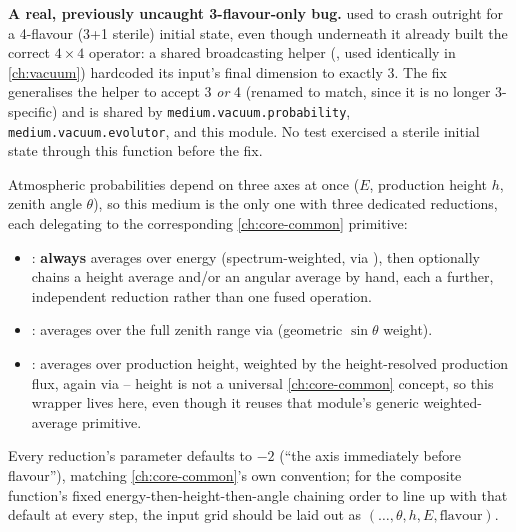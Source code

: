 \begin{notebox}
\textbf{A real, previously uncaught 3-flavour-only bug.}
 used to crash outright for a
4-flavour (3+1 sterile) initial state, even though
 underneath it already built the correct
$4\times4$ operator: a shared broadcasting helper
(, used identically in
\cref{ch:vacuum}) hardcoded its input's final dimension to exactly 3. The
fix generalises the helper to accept 3 \emph{or} 4 (renamed
 to match, since it is no longer
3-specific) and is shared by \texttt{medium.vacuum.probability},
\texttt{medium.vacuum.evolutor}, and this module. No test exercised a
sterile initial state through this function before the fix.
\end{notebox}

\begin{implbox}
Atmospheric probabilities depend on three axes at once ($E$, production
height $h$, zenith angle $\theta$), so this medium is the only one with
three dedicated  reductions, each delegating to the
corresponding \cref{ch:core-common} primitive:
\begin{itemize}
  \item {}:
    \textbf{always} averages over energy (spectrum-weighted, via
    ), then
    optionally chains a height average and/or an angular average by hand,
    each a further, independent reduction rather than one fused operation.
  \item {}:
    averages over the full zenith range via
    (geometric $\sin\theta$ weight).
  \item {}:
    averages over production height, weighted by the height-resolved
    production flux, again via
     -- height is
    not a universal \cref{ch:core-common} concept, so this wrapper lives
    here, even though it reuses that module's generic weighted-average
    primitive.
\end{itemize}
Every reduction's  parameter defaults to $-2$ (``the axis
immediately before flavour''), matching \cref{ch:core-common}'s own
convention; for the composite function's fixed energy-then-height-then-angle
chaining order to line up with that default at every step, the input grid
should be laid out as $(\ldots,\theta,h,E,\text{flavour})$.
\end{implbox}

